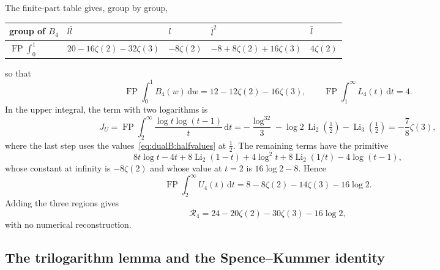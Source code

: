 \documentclass[11pt,a4paper]{article}
\numberwithin{equation}{section}
\newcommand{\dd}{\,\mathrm d}
\newcommand{\FP}{\operatorname{FP}}
\newcommand{\Li}{\operatorname{Li}}
\begin{document}
The finite-part table gives, group by group,
\begin{center}\small
\begin{tabular}{@{}lllll@{}}
\toprule
group of $B_4$ & $l\bar l$ & $l$ & $\bar l^2$ & $\bar l$\\
\midrule
$\FP\int_0^1$ & $20-16\zeta(2)-32\zeta(3)$ & $-8\zeta(2)$ & $-8+8\zeta(2)+16\zeta(3)$ & $4\zeta(2)$\\
\bottomrule
\end{tabular}
\end{center}
so that
\begin{equation}
 \FP\!\int_0^1B_4(w)\dd w=12-12\zeta(2)-16\zeta(3),\qquad \FP\!\int_1^\infty L_4(t)\dd t=4.
\end{equation}
In the upper integral, the term with two logarithms is
\begin{equation}
 J_U=\FP\!\int_2^\infty\frac{\log t\log(t-1)}{t}\dd t=-\frac{\log^32}{3}-\log2\,\Li_2(\tfrac12)-\Li_3(\tfrac12)
 =-\frac78\zeta(3),
 \label{eq:dualB:JU}
\end{equation}
where the last step uses the values~\eqref{eq:dualB:halfvalues} at $\frac12$. The remaining terms have the primitive
\begin{equation}
 8t\log t-4t+8\Li_2(1-t)+4\log^2t+8\Li_2(1/t)-4\log(t-1),
\end{equation}
whose constant at infinity is $-8\zeta(2)$ and whose value at $t=2$ is $16\log2-8$. Hence
\begin{equation}
 \FP\!\int_2^\infty U_4(t)\dd t=8-8\zeta(2)-14\zeta(3)-16\log2.
\end{equation}
Adding the three regions gives
\begin{equation}
 \mathcal R_4=24-20\zeta(2)-30\zeta(3)-16\log2,
 \label{eq:dualB:Rclosed}
\end{equation}
with no numerical reconstruction.

\subsection{The trilogarithm lemma and the Spence--Kummer identity}\label{app:dualB:trilog}
\end{document}
